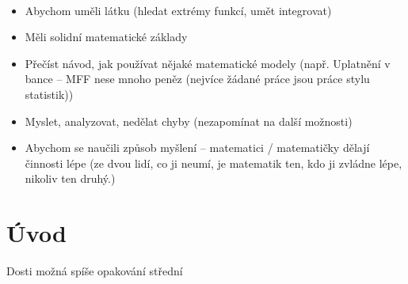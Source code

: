 \documentclass[12pt]{article}					%
\begin{document}
    \begin{poznamka}
        \ 
        \begin{itemize}
            \item Abychom uměli látku (hledat extrémy funkcí, umět integrovat)
            \item Měli solidní matematické základy
            \item Přečíst návod, jak používat nějaké matematické modely (např. Uplatnění v bance -- MFF nese mnoho peněz (nejvíce žádané práce jsou práce stylu statistik))
            \item Myslet, analyzovat, nedělat chyby (nezapomínat na další možnosti)
            \item Abychom se naučili způsob myšlení -- matematici / matematičky dělají činnosti lépe (ze dvou lidí, co ji neumí, je matematik ten, kdo ji zvládne lépe, nikoliv ten druhý.)
        \end{itemize}
    \end{poznamka}

\section{Úvod}
    Dosti možná spíše opakování střední
\end{document}
